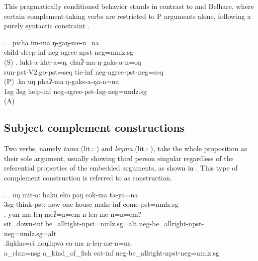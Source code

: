 This pragmatically conditioned behavior stands in contrast to  and Belhare, where certain complement-taking verbs are restricted to P arguments alone, following a purely syntactic constraint \citep{Bickeletal2001Syntactic, Bickeletal2010Ditransitives}. 

\ex. \ag. picha im-ma ŋ-gaŋ-me-n=na\\
child sleep-{\sc inf} {\sc neg}-agree{\sc [3sg]-npst-neg=nmlz.sg}\\
 (S)
\bg. lukt-a-khy-a=ŋ, chuʔ-ma  ŋ-gaks-a-n=oŋ\\
run{\sc [3sg]-pst-V2.go-pst=seq} tie{\sc -inf} {\sc neg-}agree{\sc [3sg]-pst-neg=seq}\\
 (P)  
\bg.ka uŋ phaʔ-ma ŋ-gaks-a-ŋa-n=na\\
{\sc 1sg} {\sc 3sg} help{\sc -inf} {\sc neg-}agree{\sc -pst-1sg-neg=nmlz.sg}\\
 (A)


\subsection{Subject complement constructions}\label{subjectcomplement}

Two verbs, namely \emph{tama}  (lit.: ) and \emph{leŋma}  (lit.: ), take the whole proposition as their sole argument, usually showing third person singular  regardless of the referential properties of the embedded arguments, as shown in \Next. This type of complement construction is referred to as  construction.

\ex. \ag. uŋ mit-a:       haku eko paŋ  cok-ma    ta-ya=na\\
	{\sc 3sg} think{\sc [3sg]-pst}: now one house make-{\sc inf} come{\sc [3sg]-pst=nmlz.sg}\\
	 
 	\bg. yun-ma leŋ-meʔ=n=em n-leŋ-me-n=n=em?\\
	sit\_down{\sc -inf} be\_allright{\sc [3sg]-npst=nmlz.sg=alt} {\sc neg-}be\_allright{\sc [3sg]-npst-neg=nmlz.sg=alt}\\
	\bg.liŋkha=ci hoŋliŋwa ca-ma n-leŋ-me-n=na\\
	a\_clan{\sc =nsg} a\_kind\_of\_fish eat{\sc -inf}	{\sc neg-}be\_allright{\sc [3sg]-npst-neg=nmlz.sg}\\ 

